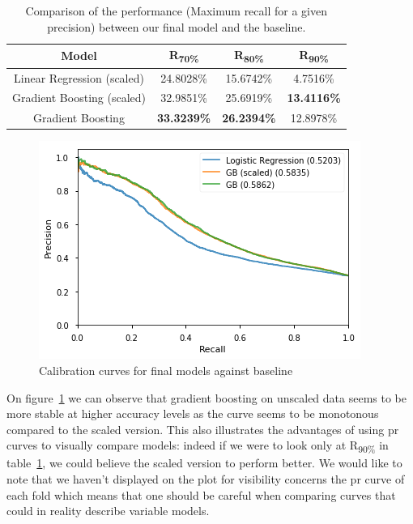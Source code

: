\begin{table}[h]
\begin{center}
\begin{tabular}{c c c c }
\hline
\textbf{Model} & \textbf{R\textsubscript{70\%}} & \textbf{R\textsubscript{80\%}}& \textbf{R\textsubscript{90\%}}\\ 
\hline\hline
Linear Regression (scaled) & 24.8028\% & 15.6742\% & 4.7516\%  \\
Gradient Boosting (scaled) & 32.9851\% & 25.6919\% & \textbf{13.4116\%} \\
Gradient Boosting  &  \textbf{33.3239\%} & \textbf{26.2394\%} & 12.8978\%
\end{tabular}
\end{center}
\caption{\label{rec_models}Comparison of the performance (Maximum recall for a given precision) between our final model and the baseline.}
\end{table}

\begin{figure}[ht]
    \begin{center}
    \includegraphics[width=0.6\linewidth]{images/model_comparison}
    \end{center}
	\caption{Calibration curves for final models against baseline}
    \label{model_comparison}
\end{figure}

On figure~\ref{model_comparison} we can observe that gradient boosting on unscaled data seems to be more stable at higher accuracy levels as the curve seems to be monotonous compared to the scaled version. This also illustrates the advantages of using \acrshort{pr} curves to visually compare models: indeed if we were to look only at R\textsubscript{90\%} in table~\ref{rec_models}, we could believe the scaled version to perform better. We would like to note that we haven't displayed on the plot for visibility concerns the \acrshort{pr} curve of each fold which means that one should be careful when comparing curves that could in reality describe variable models. 

